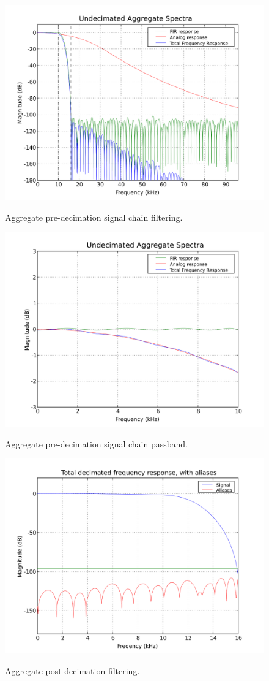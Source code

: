 \begin{figure}[h!]
\includegraphics[scale=1.0]{soma-1.digital.aggregate.svg}
\label{digital.aggregate}
\caption{Aggregate pre-decimation signal chain filtering.}
\includegraphics[scale=1.0]{soma-1.digital.pass.svg}
\label{digital.pass}
\caption{Aggregate pre-decimation signal chain passband.}
\end{figure}  


\begin{figure}[h!]
\includegraphics[scale=1.0]{soma-1.digital.withaliases.svg}
\label{digital.withaliases}
\caption{Aggregate post-decimation filtering.}
\end{figure}  
